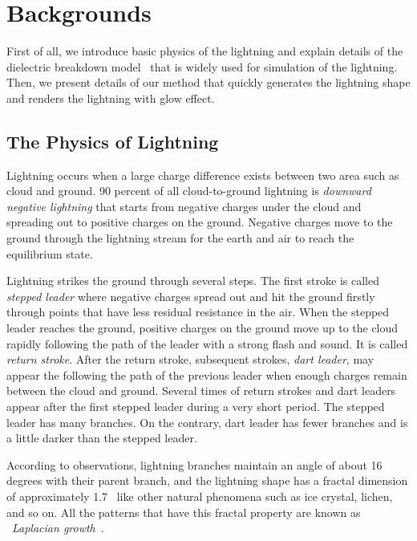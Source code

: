 \section{Backgrounds}

First of all, we introduce basic physics of the lightning and explain details of the dielectric breakdown model~\cite{Niemeyer1984} that is widely used for simulation of the lightning. Then, we present details of our method that quickly generates the lightning shape and renders the lightning with glow effect.



\subsection{The Physics of Lightning}

Lightning occurs when a large charge difference exists between two area such
as cloud and ground. 90 percent of all cloud-to-ground lightning is
\textit{downward negative lightning} that starts from negative charges
under the cloud and spreading out to positive charges on the ground. Negative
charges move to the ground through the lightning stream for the earth and air
to reach the equilibrium state.

Lightning strikes the ground through several steps. The first stroke is called
\textit{stepped leader} where negative charges spread out and hit the ground
firstly through points that have less residual resistance in the air. When the
stepped leader reaches the ground, positive charges on the ground move up to
the cloud rapidly following the path of the leader with a strong flash and
sound. It is called \textit{return stroke}. After the return stroke, subsequent
strokes, \textit{dart leader}, may appear the following the path of the
previous leader when enough charges remain between the cloud and ground.
Several times of return strokes and dart leaders appear after the first stepped
leader during a very short period. The stepped leader has many branches. On the
contrary, dart leader has fewer branches and is a little darker than the
stepped leader.

According to observations, lightning branches maintain an angle of about 16
degrees with their parent branch, and the lightning shape has a fractal
dimension of approximately 1.7~\cite{Niemeyer1984} like other natural phenomena
such as ice crystal, lichen, and so on. All the patterns that have this fractal
property are known as ~\textit{Laplacian growth}~\cite{Hastings1998}.




